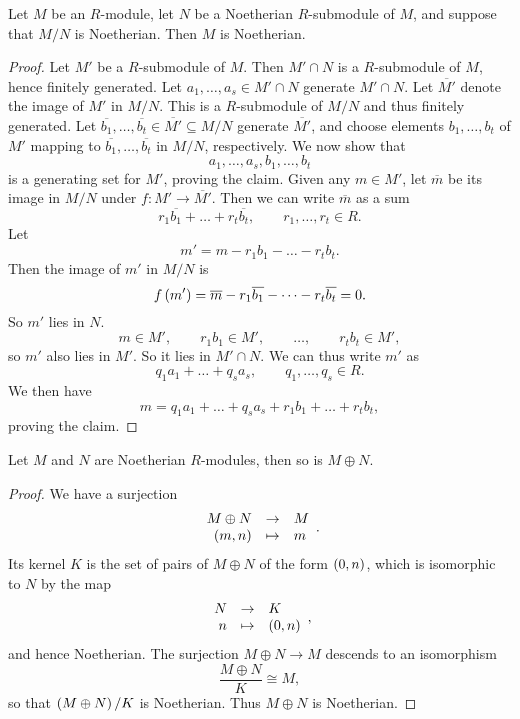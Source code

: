 \begin{proposition}
Let $ M $ be an $ R $-module, let $ N $ be a Noetherian $ R $-submodule of $ M $, and suppose that $ M / N $ is Noetherian. Then $ M $ is Noetherian.
\end{proposition}

\begin{proof}
Let $ M' $ be a $ R $-submodule of $ M $. Then $ M' \cap N $ is a $ R $-submodule of $ M $, hence finitely generated. Let $ a_1, \dots, a_s \in M' \cap N $ generate $ M' \cap N $. Let $ \overline{M'} $ denote the image of $ M' $ in $ M / N $. This is a $ R $-submodule of $ M / N $ and thus finitely generated. Let $ \overline{b_1}, \dots, \overline{b_t} \in \overline{M'} \subseteq M / N $ generate $ \overline{M'} $, and choose elements $ b_1, \dots, b_t $ of $ M' $ mapping to $ \overline{b_1}, \dots, \overline{b_t} $ in $ M / N $, respectively. We now show that
$$ a_1, \dots, a_s, b_1, \dots, b_t $$
is a generating set for $ M' $, proving the claim. Given any $ m \in M' $, let $ \overline{m} $ be its image in $ M / N $ under $ f : M' \to \overline{M'} $. Then we can write $ \overline{m} $ as a sum
$$ r_1\overline{b_1} + \dots + r_t\overline{b_t}, \qquad r_1, \dots, r_t \in R. $$
Let
$$ m' = m - r_1b_1 - \dots - r_tb_t. $$
Then the image of $ m' $ in $ M / N $ is
$$ f\left( m' \right) = \overline{m} - r_1\overline{b_1} - \dots - r_t\overline{b_t} = 0. $$
So $ m' $ lies in $ N $.
$$ m \in M', \qquad r_1b_1 \in M', \qquad \dots, \qquad r_tb_t \in M', $$
so $ m' $ also lies in $ M' $. So it lies in $ M' \cap N $. We can thus write $ m' $ as
$$ q_1a_1 + \dots + q_sa_s, \qquad q_1, \dots, q_s \in R. $$
We then have
$$ m = q_1a_1 + \dots + q_sa_s + r_1b_1 + \dots + r_tb_t, $$
proving the claim.
\end{proof}

\begin{corollary}
Let $ M $ and $ N $ are Noetherian $ R $-modules, then so is $ M \oplus N $.
\end{corollary}

\begin{proof}
We have a surjection
$$ \function{M \oplus N}{M}{\rb{m, n}}{m}. $$
Its kernel $ K $ is the set of pairs of $ M \oplus N $ of the form $ \left( 0, n \right) $, which is isomorphic to $ N $ by the map
$$ \function{N}{K}{n}{\rb{0, n}}, $$
and hence Noetherian. The surjection $ M \oplus N \to M $ descends to an isomorphism
$$ \dfrac{M \oplus N}{K} \cong M, $$
so that $ \left( M \oplus N \right) / K $ is Noetherian. Thus $ M \oplus N $ is Noetherian.
\end{proof}

